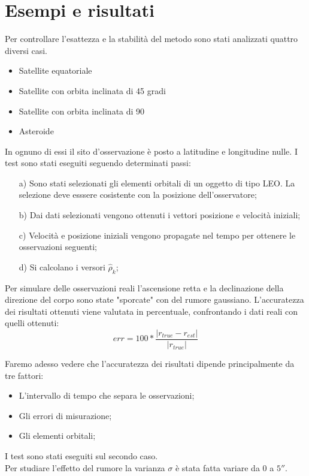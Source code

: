 \documentclass{beamer}
\begin{document}
\section{Esempi e risultati}
\begin{frame}
Per controllare l'esattezza e la stabilit\`a del metodo sono stati analizzati quattro diversi casi. \\
 \begin{itemize}
\item Satellite equatoriale
\item Satellite con orbita inclinata di 45 gradi
\item Satellite con orbita inclinata di 90
\item Asteroide
\end{itemize}
\end{frame}

\begin{frame}[plain]
In ognuno di essi il sito d'osservazione \`e posto a latitudine e longitudine nulle. I test sono stati eseguiti seguendo determinati passi: \begin{itemize}
\item[a)] Sono stati selezionati gli elementi orbitali di un oggetto di tipo LEO. La selezione deve esssere cosistente con la posizione dell'osservatore;
\item[b)] Dai dati selezionati vengono ottenuti i vettori posizione e velocit\`a iniziali;
\item[c)] Velocit\`a e posizione iniziali vengono propagate nel tempo per ottenere le osservazioni seguenti;
\item[d)] Si calcolano i versori $\hat{\rho}_k$;
\end{itemize}
\end{frame}
\begin{frame}[plain]
Per simulare delle osservazioni reali l'ascensione retta e la declinazione della direzione del corpo sono state "sporcate" con del rumore gaussiano.
L'accuratezza dei risultati ottenuti viene valutata in percentuale, confrontando i dati reali con quelli ottenuti:
\begin{equation}
err=100*\frac{|r_{true}-r_{est}|}{|r_{true}|}
\end{equation}
\end{frame}



\begin{frame}[plain]
Faremo adesso vedere che l'accuratezza dei risultati dipende principalmente da tre fattori: \begin{itemize}
\item L'intervallo di tempo che separa le osservazioni;
\item Gli errori di misurazione;
\item Gli elementi orbitali;
\end{itemize}
I test sono stati eseguiti sul secondo caso. \\
Per studiare l'effetto del rumore la varianza $\sigma$ \`e stata fatta variare da $0$ a $5''$.
\end{frame}
\end{document}
